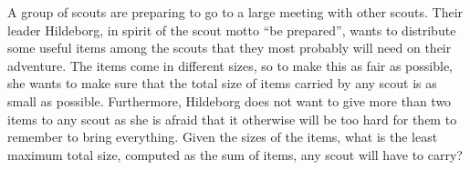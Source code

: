 
%

A group of scouts are preparing to go to a large meeting with other scouts. Their leader Hildeborg, in spirit of the scout motto ``be prepared'', wants to distribute some useful items among the scouts that they most probably will need on their adventure. The items come in different sizes, so to make this as fair as possible, she wants to make sure that the total size of items carried by any scout is as small as possible. Furthermore, Hildeborg does not want to give more than two items to any scout as she is afraid that it otherwise will be too hard for them to remember to bring everything. Given the sizes of the items, what is the least maximum total size, computed as the sum of items, any scout will have to carry?

